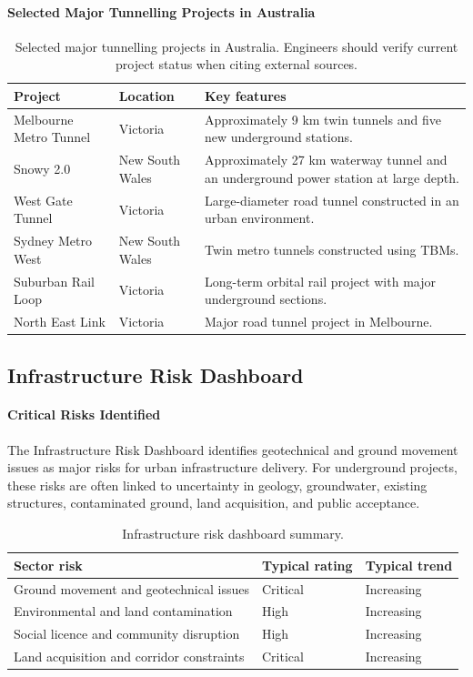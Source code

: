 \paragraph{Selected Major Tunnelling Projects in Australia}

\begin{table}[H]
\centering
\small
\begin{tabularx}{\textwidth}{l l X}
\toprule
\textbf{Project} & \textbf{Location} & \textbf{Key features} \\
\midrule
Melbourne Metro Tunnel & Victoria & Approximately 9 km twin tunnels and five new underground stations. \\
Snowy 2.0 & New South Wales & Approximately 27 km waterway tunnel and an underground power station at large depth. \\
West Gate Tunnel & Victoria & Large-diameter road tunnel constructed in an urban environment. \\
Sydney Metro West & New South Wales & Twin metro tunnels constructed using TBMs. \\
Suburban Rail Loop & Victoria & Long-term orbital rail project with major underground sections. \\
North East Link & Victoria & Major road tunnel project in Melbourne. \\
\bottomrule
\end{tabularx}
\caption{Selected major tunnelling projects in Australia. Engineers should verify current project status when citing external sources.}
\end{table}

\subsection{Infrastructure Risk Dashboard}

\paragraph{Critical Risks Identified}
The Infrastructure Risk Dashboard identifies geotechnical and ground movement issues as major risks for urban infrastructure delivery. For underground projects, these risks are often linked to uncertainty in geology, groundwater, existing structures, contaminated ground, land acquisition, and public acceptance.

\begin{table}[H]
\centering
\small
\begin{tabularx}{\textwidth}{X l l}
\toprule
\textbf{Sector risk} & \textbf{Typical rating} & \textbf{Typical trend} \\
\midrule
Ground movement and geotechnical issues & Critical & Increasing \\
Environmental and land contamination & High & Increasing \\
Social licence and community disruption & High & Increasing \\
Land acquisition and corridor constraints & Critical & Increasing \\
\bottomrule
\end{tabularx}
\caption{Infrastructure risk dashboard summary.}
\end{table}


